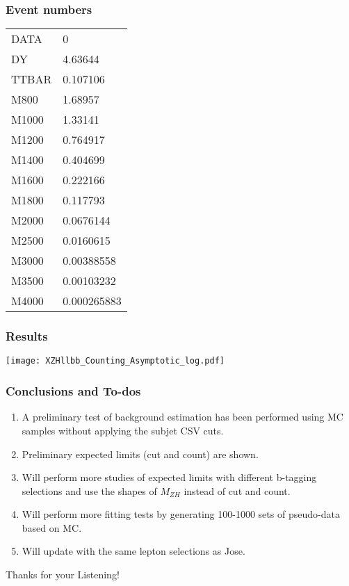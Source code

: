 \documentclass[aspectratio=169]{beamer}
\begin{document}
\begin{frame}
  \frametitle{Event numbers}
  \justifying
  \begin{tiny}
    \begin{center}
      \begin{tabular}{ | l | l | }
        \hline
        DATA  & 0           \\
        DY    & 4.63644     \\
        TTBAR & 0.107106    \\
        M800  & 1.68957     \\
        M1000 & 1.33141     \\
        M1200 & 0.764917    \\
        M1400 & 0.404699    \\
        M1600 & 0.222166    \\
        M1800 & 0.117793    \\
        M2000 & 0.0676144   \\
        M2500 & 0.0160615   \\
        M3000 & 0.00388558  \\
        M3500 & 0.00103232  \\
        M4000 & 0.000265883 \\
        \hline
      \end{tabular}
    \end{center}
  \end{tiny}
\end{frame}
\begin{frame}
  \frametitle{Results}
  \begin{center}
    \texttt{[image: XZHllbb\_Counting\_Asymptotic\_log.pdf]}
  \end{center}
\end{frame}
\begin{frame}
  \frametitle{Conclusions and To-dos}
  \justifying 
  \begin{footnotesize}
    \begin{enumerate}[1.]
      \setcounter{enumi}{0} %
    \item A preliminary test of background estimation has been performed using MC samples without applying the subjet CSV cuts.
    \item Preliminary expected limits (cut and count) are shown. 
    \item Will perform more studies of expected limits with different b-tagging selections and use the shapes of $M_{ZH}$ instead of cut and count.
    \item Will perform more fitting tests by generating 100-1000 sets of pseudo-data based on MC.
    \item Will update with the same lepton selections as Jose.
    \end{enumerate}
  \end{footnotesize}
\end{frame}
\begin{frame}
  \Huge{\centerline{Thanks for your Listening!}}
\end{frame}
\end{document}
